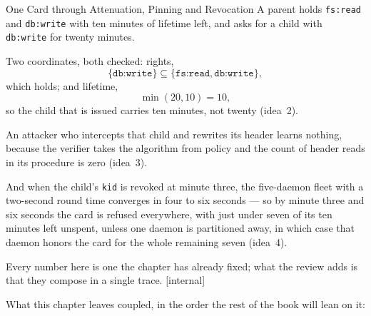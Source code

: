 \documentclass[11pt,a4paper]{article}
\theoremstyle{definition}
\begin{document}
\begin{pdexample}{One Card through Attenuation, Pinning and Revocation}
\setlength{\parskip}{4pt plus 1pt}
A parent holds \texttt{fs:read} and \texttt{db:write} with ten minutes of
lifetime left, and asks for a child with \texttt{db:write} for twenty minutes.

Two coordinates, both checked: rights,
\[
\{\texttt{db:write}\} \subseteq \{\texttt{fs:read},\texttt{db:write}\},
\]
which
holds; and lifetime,
\[
\min(20,10) = 10,
\]
so the child that is issued carries
ten minutes, not twenty (idea~2).

An attacker who intercepts that child and
rewrites its header learns nothing, because the verifier takes the algorithm
from policy and the count of header reads in its procedure is zero (idea~3).

And when the child's \texttt{kid} is revoked at minute three, the five-daemon
fleet with a two-second round time converges in four to six seconds --- so by
minute three and six seconds the card is refused everywhere, with just under
seven of its ten minutes left unspent, unless one daemon is partitioned away,
in which case that daemon honors the card for the whole remaining seven
(idea~4).

Every number here is one the
chapter has already fixed; what the review adds is that they compose in a
single trace. [internal]
\end{pdexample}

What this chapter leaves coupled, in the order the rest of the book will lean on it:
\end{document}
